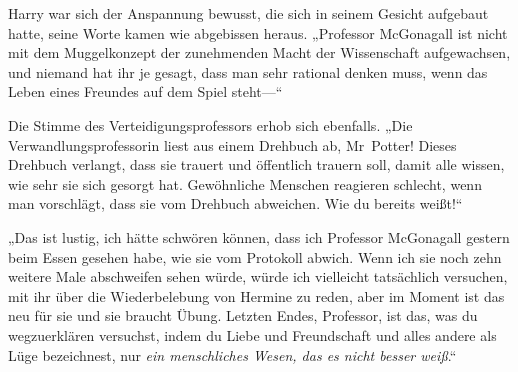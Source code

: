 Harry war sich der Anspannung bewusst, die sich in seinem Gesicht aufgebaut hatte, seine Worte kamen wie abgebissen heraus. „Professor McGonagall ist nicht mit dem Muggelkonzept der zunehmenden Macht der Wissenschaft aufgewachsen, und niemand hat ihr je gesagt, dass man sehr rational denken muss, wenn das Leben eines Freundes auf dem Spiel steht—“

Die Stimme des Verteidigungsprofessors erhob sich ebenfalls. „Die Verwandlungsprofessorin liest aus einem Drehbuch ab, Mr~Potter! Dieses Drehbuch verlangt, dass sie trauert und öffentlich trauern soll, damit alle wissen, wie sehr sie sich gesorgt hat. Gewöhnliche Menschen reagieren schlecht, wenn man vorschlägt, dass sie vom Drehbuch abweichen. Wie du bereits weißt!“

„Das ist lustig, ich hätte schwören können, dass ich Professor McGonagall gestern beim Essen gesehen habe, wie sie vom Protokoll abwich. Wenn ich sie noch zehn weitere Male abschweifen sehen würde, würde ich vielleicht tatsächlich versuchen, mit ihr über die Wiederbelebung von Hermine zu reden, aber im Moment ist das neu für sie und sie braucht Übung. Letzten Endes, Professor, ist das, was du wegzuerklären versuchst, indem du Liebe und Freundschaft und alles andere als Lüge bezeichnest, nur \emph{ein menschliches Wesen, das es nicht besser weiß}.“

